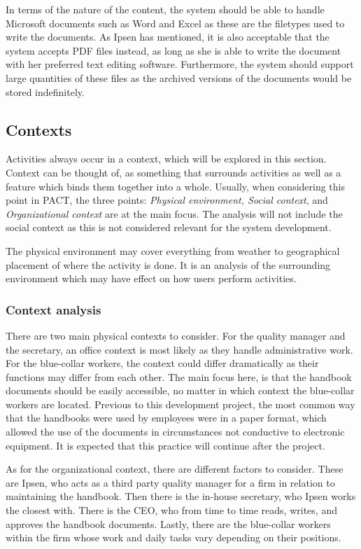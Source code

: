 In terms of the nature of the content, the system should be able to handle Microsoft documents such as Word and Excel as these are the filetypes used to write the documents.
As Ipsen has mentioned, it is also acceptable that the system accepts PDF files instead, as long as she is able to write the document with her preferred text editing software.
Furthermore, the system should support large quantities of these files as the archived versions of the documents would be stored indefinitely.

\subsection{Contexts}\label{sec:pactcontext}
Activities always occur in a context, which will be explored in this section.
Context can be thought of, as something that surrounds activities as well as a feature which binds them together into a whole.
Usually, when considering this point in PACT, the three points: \textit{Physical environment, Social context}, and \textit{Organizational context} are at the main focus.
The analysis will not include the social context as this is not considered relevant for the system development.

The physical environment may cover everything from weather to geographical placement of where the activity is done.
It is an analysis of the surrounding environment which may have effect on how users perform activities.

\subsubsection*{Context analysis}
There are two main physical contexts to consider.
For the quality manager and the secretary, an office context is most likely as they handle administrative work.
For the blue-collar workers, the context could differ dramatically as their functions may differ from each other.
The main focus here, is that the handbook documents should be easily accessible, no matter in which context the blue-collar workers are located.
Previous to this development project, the most common way that the handbooks were used by employees were in a paper format, which allowed the use of the documents in circumstances not conductive to electronic equipment.
It is expected that this practice will continue after the project.

As for the organizational context, there are different factors to consider.
These are Ipsen, who acts as a third party quality manager for a firm in relation to maintaining the handbook.
Then there is the in-house secretary, who Ipsen works the closest with.
There is the CEO, who from time to time reads, writes, and approves the handbook documents.
Lastly, there are the blue-collar workers within the firm whose work and daily tasks vary depending on their positions.

